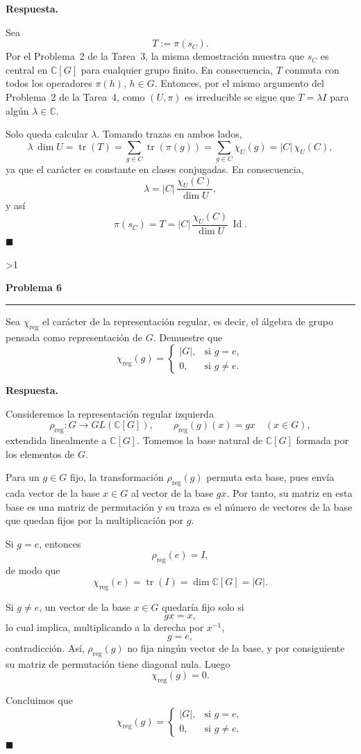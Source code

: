 \documentclass[10pt,a4paper]{article}
\newcommand{\CC}{\mathbb{C}}
\newcommand{\Id}{\operatorname{Id}}
\newcommand{\inlinehead}[2][repblue]{%
  \par\smallskip
  {\color{#1}\bfseries #2.}\hspace{0.45em}%
}
\newcommand{\answer}{\inlinehead{Respuesta}}
\newcounter{probcnt}
\newcommand{\problem}[2]{%
  \stepcounter{probcnt}%
  \ifnum\value{probcnt}>1\newpage\fi
  \par\vspace{0.25em}
  {\large\bfseries\color{repblue} Problema #1}\par
  {\color{repline}\rule{\linewidth}{0.55pt}}\par
  \begin{tcolorbox}[
    breakable,
    colback=white,
    colframe=repline,
    borderline west={1.6pt}{0pt}{repteal},
    left=0.7em,
    right=0.7em,
    top=0.35em,
    bottom=0.3em,
    before skip=0.35em,
    after skip=0.45em
  ]
    #2
  \end{tcolorbox}
}
\begin{document}
\answer
Sea
\[
  T:=\pi(s_C).
\]
Por el Problema~2 de la Tarea~3, la misma demostración muestra que $s_C$ es
central en $\CC[G]$ para cualquier grupo finito. En consecuencia, $T$ conmuta
con todos los operadores $\pi(h)$, $h\in G$. Entonces, por el mismo argumento
del Problema~2 de la Tarea~4, como $(U,\pi)$ es irreducible se sigue que
$T=\lambda I$ para algún $\lambda\in\CC$.

Solo queda calcular $\lambda$. Tomando trazas en ambos lados,
\[
  \lambda\,\dim U
  =\operatorname{tr}(T)
  =\sum_{g\in C}\operatorname{tr}(\pi(g))
  =\sum_{g\in C}\chi_U(g)
  =|C|\,\chi_U(C),
\]
ya que el carácter es constante en clases conjugadas. En consecuencia,
\[
  \lambda=|C|\,\frac{\chi_U(C)}{\dim U},
\]
y así
\[
  \pi(s_C)=T=|C|\,\frac{\chi_U(C)}{\dim U}\,\Id.
\]
\hfill$\blacksquare$

\problem{6}{%
Sea $\chi_{\mathrm{reg}}$ el carácter de la representación regular, es decir, el álgebra de
grupo pensada como representación de $G$. Demuestre que
\[
  \chi_{\mathrm{reg}}(g) =
  \begin{cases}
    |G|, & \text{si } g = e,\\
    0, & \text{si } g \ne e.
  \end{cases}
\]
}

\answer
Consideremos la representación regular izquierda
\[
  \rho_{\mathrm{reg}}\colon G\to GL(\CC[G]),
  \qquad
  \rho_{\mathrm{reg}}(g)(x)=gx
  \quad (x\in G),
\]
extendida linealmente a $\CC[G]$. Tomemos la base natural de $\CC[G]$
formada por los elementos de $G$.

Para un $g\in G$ fijo, la transformación $\rho_{\mathrm{reg}}(g)$ permuta esta
base, pues envía cada vector de la base $x\in G$ al vector de la base $gx$.
Por tanto, su matriz en esta base es una matriz de permutación y su traza es
el número de vectores de la base que quedan fijos por la multiplicación por $g$.

Si $g=e$, entonces
\[
  \rho_{\mathrm{reg}}(e)=I,
\]
de modo que
\[
  \chi_{\mathrm{reg}}(e)=\operatorname{tr}(I)=\dim \CC[G]=|G|.
\]

Si $g\ne e$, un vector de la base $x\in G$ quedaría fijo solo si
\[
  gx=x,
\]
lo cual implica, multiplicando a la derecha por $x^{-1}$,
\[
  g=e,
\]
contradicción. Así, $\rho_{\mathrm{reg}}(g)$ no fija ningún vector de la base,
y por consiguiente su matriz de permutación tiene diagonal nula. Luego
\[
  \chi_{\mathrm{reg}}(g)=0.
\]

Concluimos que
\[
  \chi_{\mathrm{reg}}(g)=
  \begin{cases}
    |G|, & \text{si } g=e,\\
    0, & \text{si } g\ne e.
  \end{cases}
\]
\hfill$\blacksquare$
\end{document}
